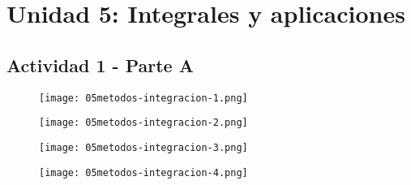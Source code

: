 \section*{Unidad 5: Integrales y aplicaciones}
%

\subsection*{Actividad 1 - Parte A}

\vspace{20pt}

\begin{figure}[H]
    \centering
    \texttt{[image: 05metodos-integracion-1.png]}
\end{figure}

\begin{figure}[H]
    \centering
    \texttt{[image: 05metodos-integracion-2.png]}
\end{figure}

\begin{figure}[H]
    \centering
    \texttt{[image: 05metodos-integracion-3.png]}
\end{figure}

\begin{figure}[H]
    \centering
    \texttt{[image: 05metodos-integracion-4.png]}
\end{figure}
